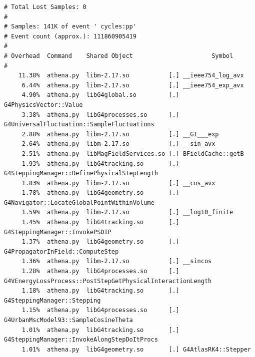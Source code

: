 \documentclass[a4paper]{jpconf}
\begin{document}
\begin{lstlisting}[float,caption=Recording of event 73 on core 8, label=event-73-processor8]
# Total Lost Samples: 0
#
# Samples: 141K of event ' cycles:pp'
# Event count (approx.): 111860905419
#
# Overhead  Command    Shared Object                      Symbol                                                                                         
#
    11.38%  athena.py  libm-2.17.so           [.] __ieee754_log_avx
     6.44%  athena.py  libm-2.17.so           [.] __ieee754_exp_avx
     4.90%  athena.py  libG4global.so         [.] G4PhysicsVector::Value
     3.38%  athena.py  libG4processes.so      [.] G4UniversalFluctuation::SampleFluctuations
     2.88%  athena.py  libm-2.17.so           [.] __GI___exp
     2.64%  athena.py  libm-2.17.so           [.] __sin_avx
     2.51%  athena.py  libMagFieldServices.so [.] BFieldCache::getB
     1.93%  athena.py  libG4tracking.so       [.] G4SteppingManager::DefinePhysicalStepLength
     1.83%  athena.py  libm-2.17.so           [.] __cos_avx
     1.78%  athena.py  libG4geometry.so       [.] G4Navigator::LocateGlobalPointWithinVolume
     1.59%  athena.py  libm-2.17.so           [.] __log10_finite
     1.45%  athena.py  libG4tracking.so       [.] G4SteppingManager::InvokePSDIP
     1.37%  athena.py  libG4geometry.so       [.] G4PropagatorInField::ComputeStep
     1.36%  athena.py  libm-2.17.so           [.] __sincos
     1.28%  athena.py  libG4processes.so      [.] G4VEnergyLossProcess::PostStepGetPhysicalInteractionLength
     1.18%  athena.py  libG4tracking.so       [.] G4SteppingManager::Stepping
     1.15%  athena.py  libG4processes.so      [.] G4UrbanMscModel93::SampleCosineTheta
     1.01%  athena.py  libG4tracking.so       [.] G4SteppingManager::InvokeAlongStepDoItProcs
     1.01%  athena.py  libG4geometry.so       [.] G4AtlasRK4::Stepper

\end{lstlisting}

\end{document}
